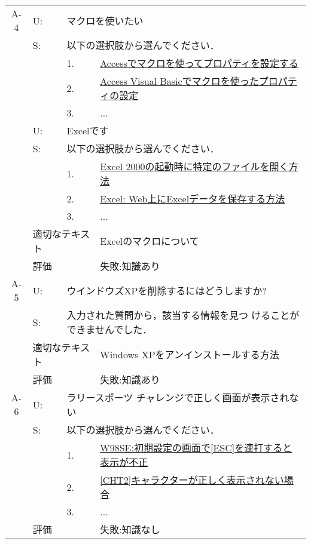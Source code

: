 \begin{table}
\begin{center}
\begin{tabular}{c|llp{10cm}}
   A-4 & U: & \multicolumn{2}{l}{マクロを使いたい} \\
       & S: & \multicolumn{2}{l}{以下の選択肢から選んでください．} \\
       &    & 1.    & \underline{Accessでマクロを使ってプロパティを設定する} \\
       &    & 2.    & \underline{Access Visual Basicでマクロを使ったプロパティの設定} \\
       &    & 3.    & ... \\
       & U: & \multicolumn{2}{l}{Excelです} \\
       & S: & \multicolumn{2}{l}{以下の選択肢から選んでください．} \\
       &    & 1.    & \underline{Excel 2000の起動時に特定のファイルを開く方法} \\
       &    & 2.    & \underline{Excel: Web上にExcelデータを保存する方法} \\
       &    & 3.    & ... \\ \cline{2-4}
       & \multicolumn{2}{l}{適切なテキスト} & Excelのマクロについて \\ \cline{2-4}
       & \multicolumn{2}{l}{評価} & 失敗:知識あり \\ \hline

   A-5 & U: & \multicolumn{2}{l}{ウインドウズXPを削除するにはどうしますか?} \\
       & S: & \multicolumn{2}{l}{入力された質問から，該当する情報を見つ
       けることができませんでした．} \\ \cline{2-4}
       & \multicolumn{2}{l}{適切なテキスト} & Windows XPをアンインストールする方法 \\ \cline{2-4}
       & \multicolumn{2}{l}{評価} & 失敗:知識あり \\ \hline

   A-6 & U: & \multicolumn{2}{l}{ラリースポーツ チャレンジで正しく画面が表示されない} \\
       & S: & \multicolumn{2}{l}{以下の選択肢から選んでください．} \\
       &    & 1.    & \underline{W98SE:初期設定の画面で[ESC]を連打すると表示が不正} \\
       &    & 2.    & \underline{[CHT2]キャラクターが正しく表示されない場合} \\
       &    & 3.    & ... \\ \cline{2-4}
       & \multicolumn{2}{l}{評価} & 失敗:知識なし \\ \hline

  \end{tabular}

 \end{center}
\end{table}



